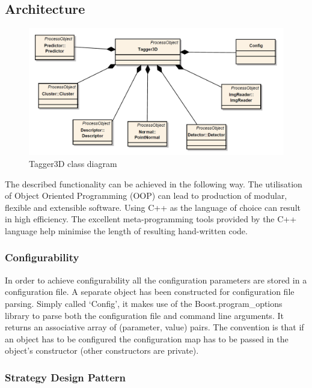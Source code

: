 	\subsection{Architecture}
	
	\begin{figure}[ht]
	\centering
	\includegraphics[width=1.0\textwidth]{figs/short}
	\caption{Tagger3D class diagram}
	\label{fig:class_diagram}
	\end{figure}
	
	The described functionality can be achieved in the following way. The utilisation of Object Oriented Programming (OOP) can lead to production of modular, flexible and extensible software. Using C++ as the language of choice can result in high efficiency. The excellent meta-programming tools provided by the C++ language help minimise the length of resulting hand-written code.
	
	\subsubsection{Configurability}
	In order to achieve configurability all the configuration parameters are stored in a configuration file. A separate object has been constructed for configuration file parsing. Simply called `Config', it makes use of the Boost.program\_options library to parse both the configuration file and command line arguments. It returns an associative array of (parameter, value) pairs. The convention is that if an object has to be configured the configuration map has to be passed in the object's constructor (other constructors are private).
	
	\subsubsection{Strategy Design Pattern}
	
